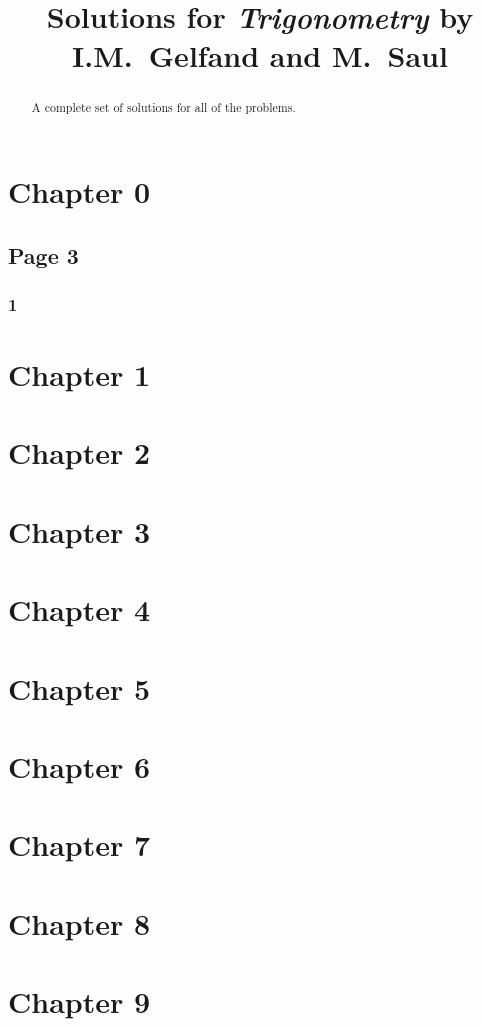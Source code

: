 \documentclass{article}
\title{Solutions for \textit{Trigonometry} by I.M.~Gelfand and M.~Saul}
\author{}
\begin{document}
\maketitle

\begin{abstract}
A complete set of solutions for all of the problems.
\end{abstract}

\section*{Chapter 0}
\subsection*{Page 3}
\subsubsection*{1}


\section*{Chapter 1}


\section*{Chapter 2}


\section*{Chapter 3}


\section*{Chapter 4}


\section*{Chapter 5}


\section*{Chapter 6}


\section*{Chapter 7}


\section*{Chapter 8}


\section*{Chapter 9}
\end{document}
